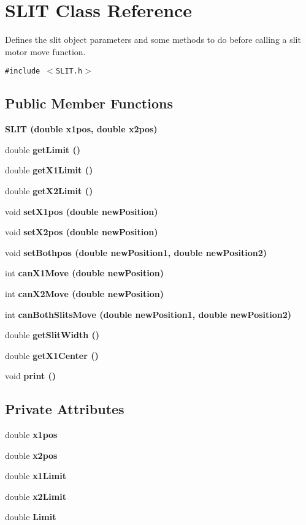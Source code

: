 \section{SLIT Class Reference}
\label{classSLIT}
Defines the slit object parameters and some methods to do before calling a slit motor move function.  


{\tt \#include $<$SLIT.h$>$}

\subsection*{Public Member Functions}
\begin{CompactItemize}
\item 
\bf{SLIT} (double \bf{x1pos}, double \bf{x2pos})
\item 
double \bf{get\-Limit} ()
\item 
double \bf{get\-X1Limit} ()
\item 
double \bf{get\-X2Limit} ()
\item 
void \bf{set\-X1pos} (double new\-Position)
\item 
void \bf{set\-X2pos} (double new\-Position)
\item 
void \bf{set\-Bothpos} (double new\-Position1, double new\-Position2)
\item 
int \bf{can\-X1Move} (double new\-Position)
\item 
int \bf{can\-X2Move} (double new\-Position)
\item 
int \bf{can\-Both\-Slits\-Move} (double new\-Position1, double new\-Position2)
\item 
double \bf{get\-Slit\-Width} ()
\item 
double \bf{get\-X1Center} ()
\item 
void \bf{print} ()
\end{CompactItemize}
\subsection*{Private Attributes}
\begin{CompactItemize}
\item 
double \bf{x1pos}
\item 
double \bf{x2pos}
\item 
double \bf{x1Limit}
\item 
double \bf{x2Limit}
\item 
double \bf{Limit}
\end{CompactItemize}


